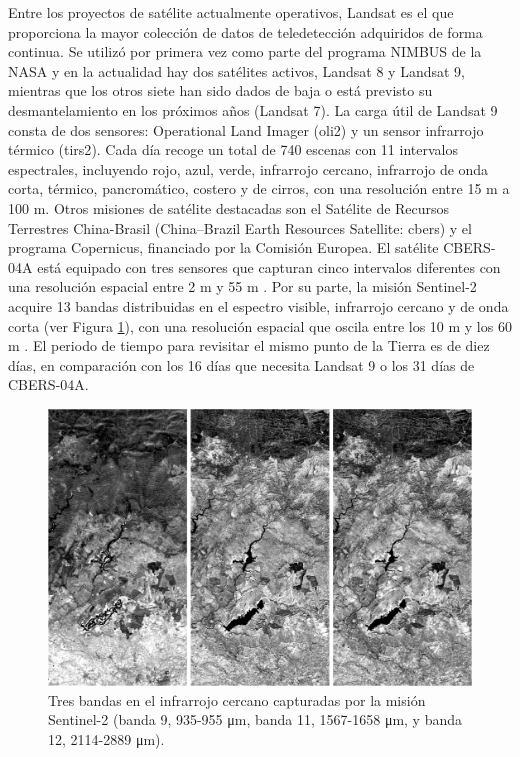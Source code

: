Entre los proyectos de satélite actualmente operativos, Landsat es el que proporciona la mayor colección de datos de teledetección adquiridos de forma continua. Se utilizó por primera vez como parte del programa NIMBUS de la NASA y en la actualidad hay dos satélites activos, Landsat 8 y Landsat 9, mientras que los otros siete han sido dados de baja o está previsto su desmantelamiento en los próximos años (Landsat 7). La carga útil de Landsat 9 consta de dos sensores: Operational Land Imager (\acrshort{oli2}) y un sensor infrarrojo térmico (\acrshort{tirs2}). Cada día recoge un total de 740 escenas con 11 intervalos espectrales, incluyendo rojo, azul, verde, infrarrojo cercano, infrarrojo de onda corta, térmico, pancromático, costero y de cirros, con una resolución entre 15 \si{\meter} a 100 \si{\meter}. Otros misiones de satélite destacadas son el Satélite de Recursos Terrestres China-Brasil (China–Brazil Earth Resources Satellite: \acrshort{cbers}) y el programa Copernicus, financiado por la Comisión Europea. El satélite CBERS-04A está equipado con tres sensores que capturan cinco intervalos diferentes con una resolución espacial entre 2 \si{\meter} y 55 \si{\meter} \cite{instituto_nacional_de_pesquisas_espaciais_inpecbers_2019}. Por su parte, la misión Sentinel-2 acquire 13 bandas distribuidas en el espectro visible, infrarrojo cercano y de onda corta (ver Figura \ref{fig:sentinel2_spanish}), con una resolución espacial que oscila entre los 10 \si{\meter} y los 60 \si{\meter} \cite{european_environment_agency_eu_2017}. El periodo de tiempo para revisitar el mismo punto de la Tierra es de diez días, en comparación con los 16 días que necesita Landsat 9 o los 31 días de CBERS-04A.

\begin{figure}[!ht]
	\includegraphics{figs/introduction/sentinel2_bands.png}
	\caption{Tres bandas en el infrarrojo cercano capturadas por la misión Sentinel-2 (banda 9, 935-955 \si{\micro\meter}, banda 11, 1567-1658 \si{\micro\meter}, y banda 12, 2114-2889 \si{\micro\meter}). }
    \label{fig:sentinel2_spanish}
\end{figure}

